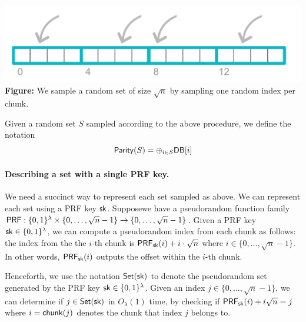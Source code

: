 \begin{center}
    \includegraphics[scale=0.6]{piano-sample}\\
{\bf Figure:} We sample a random set of size $\sqrt{n}$ by sampling one random index per chunk.
\end{center}

Given a random set $S$ sampled according to the above procedure,
we define the notation
\[
{\sf Parity}(S) = \oplus_{i \in S}{\sf DB}[i] 
\] 


\paragraph{Describing a set with a single PRF key.}
We need a succinct way to represent each set sampled as above.
We can represent each 
set using a PRF key ${\sf sk}$.
Supposewe have a 
pseudorandom function family 
${\sf PRF}:\{0,1\}^\lambda\times \{0,\dots,\sqrt{n}-1\}\to \{0,\dots,\sqrt{n}-1\}$. 
Given a PRF key ${\sf sk} \in \{0, 1\}^\lambda$, 
we can compute a pseudorandom 
index from each chunk as follows:
the index from the 
the $i$-th chunk is ${\sf PRF}_{\sf sk}(i)+i\cdot\sqrt{n}$ where $i \in \{0, \ldots, \sqrt{n}-1\}$. 
In other words,
${\sf PRF}_{\sf sk}(i)$ outputs the offset within the 
$i$-th chunk.

%

Henceforth, we use the notation ${\sf Set}({\sf sk})$ to denote
the pseudorandom set generated by the PRF key ${\sf sk} \in \{0, 1\}^\lambda$.
Given an index $j \in \{0,\dots,\sqrt{n}-1\}$,
we can determine if 
$j \in {\sf Set}({\sf sk})$ in $O_\lambda(1)$ time, 
by checking 
if ${\sf PRF}_{\sf sk}(i) + i \sqrt{n} = j$ where $i = {\sf chunk}(j)$ denotes
the chunk that index $j$ belongs to.




